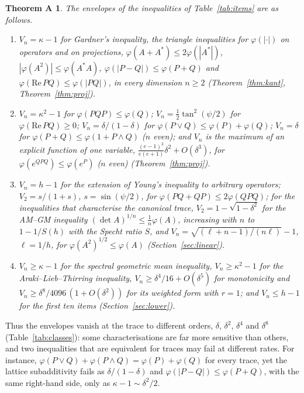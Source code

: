 \documentclass[11pt]{article}
\renewcommand{\Re}{\mathrm{Re}\,}
\theoremstyle{plain}
\newtheorem*{thmA}{Theorem A}
\theoremstyle{definition}
\theoremstyle{remark}
\begin{document}
\begin{thmA}
The envelopes of the inequalities of Table~\ref{tab:items} are as follows.
\begin{enumerate}
\item[(a)] $V_n=\kappa-1$ for Gardner's inequality, the triangle inequalities for $\varphi(|\cdot|)$ on operators and on
projections, $\varphi(A+A^*)\le2\varphi(|A^*|)$, $|\varphi(A^2)|\le\varphi(A^*A)$, $\varphi(|P-Q|)\le\varphi(P+Q)$ and
$\varphi(\Re PQ)\le\varphi(|PQ|)$, in every dimension $n\ge2$ (Theorem~\ref{thm:kant}, Theorem~\ref{thm:proj}).
\item[(b)] $V_n=\kappa^2-1$ for $\varphi(PQP)\le\varphi(Q)$; $V_n=\frac12\tan^2(\psi/2)$ for $\varphi(\Re PQ)\ge0$;
$V_n=\delta/(1-\delta)$ for $\varphi(P\vee Q)\le\varphi(P)+\varphi(Q)$; $V_n=\delta$ for $\varphi(P+Q)\le\varphi(1+P\wedge Q)$
($n$ even); and $V_n$ is the maximum of an explicit function of one variable, $\frac{(e-1)^2}{e(e+1)}\delta^2+O(\delta^3)$, for
$\varphi(e^{QPQ})\le\varphi(e^P)$ ($n$ even) (Theorem~\ref{thm:proj}).
\item[(c)] $V_n=h-1$ for the extension of Young's inequality to arbitrary operators; $V_2=s/(1+s)$, $s=\sin(\psi/2)$, for
$\varphi(PQ+QP)\le2\varphi(QPQ)$; for the inequalities that characterise the \emph{canonical} trace, $V_2=1-\sqrt{1-\delta^2}$
for the AM--GM inequality $(\det A)^{1/n}\le\frac1n\varphi(A)$, increasing with $n$ to $1-1/S(h)$ with the Specht ratio $S$,
and $V_n=\sqrt{(\ell+n-1)/(n\ell)}-1$, $\ell=1/h$, for $\varphi(A^2)^{1/2}\le\varphi(A)$ (Section~\ref{sec:linear}).
\item[(d)] $V_n\ge\kappa-1$ for the spectral geometric mean inequality, $V_n\ge\kappa^2-1$ for the Araki--Lieb--Thirring
inequality, $V_n\ge\delta^4/16+O(\delta^5)$ for monotonicity and $V_n\ge\delta^8/4096\,(1+O(\delta^2))$ for its weighted form
with $r=1$; and $V_n\le h-1$ for the first ten items (Section~\ref{sec:lower}).
\end{enumerate}
\end{thmA}

Thus the envelopes vanish at the trace to different orders, $\delta$, $\delta^2$, $\delta^4$ and $\delta^8$
(Table~\ref{tab:classes}): some characterisations are far more sensitive than others, and two inequalities that are
equivalent for traces may fail at different rates. For instance, $\varphi(P\vee Q)+\varphi(P\wedge Q)=\varphi(P)+
\varphi(Q)$ for every trace, yet the lattice subadditivity fails as $\delta/(1-\delta)$ and $\varphi(|P-Q|)\le
\varphi(P+Q)$, with the same right-hand side, only as $\kappa-1\sim\delta^2/2$.
\end{document}
